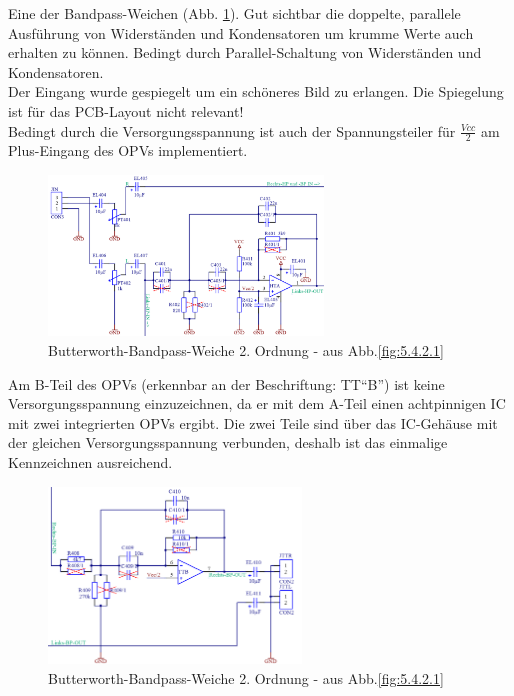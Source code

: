 \newpage
Eine der Bandpass-Weichen (Abb. \ref{fig:5.4.2.2}).
Gut sichtbar die doppelte, parallele Ausführung von Widerständen und Kondensatoren um krumme Werte auch erhalten zu können.
Bedingt durch Parallel-Schaltung von Widerständen und Kondensatoren.\\ 
Der Eingang wurde gespiegelt um ein schöneres Bild zu erlangen.
Die Spiegelung ist für das PCB-Layout nicht relevant!\\
Bedingt durch die Versorgungsspannung ist auch der Spannungsteiler für $\frac{Vcc}{2}$ am Plus-Eingang des OPVs implementiert.
\begin{figure} [H]
	\centering	
	\includegraphics[width=0.65\textwidth]{img/Print4/4_TTuHTWeiche-LinksHP-Schematic.PNG}
	\caption{Butterworth-Bandpass-Weiche 2. Ordnung - aus Abb.\ref{fig:5.4.2.1}}
	\label {fig:5.4.2.2}
\end{figure}
Am B-Teil des OPVs (erkennbar an der Beschriftung: TT\enquote{B}) ist keine Versorgungsspannung einzuzeichnen, da er mit dem A-Teil einen achtpinnigen IC mit zwei integrierten OPVs ergibt.
Die zwei Teile sind über das IC-Gehäuse mit der gleichen Versorgungsspannung verbunden, deshalb ist das einmalige Kennzeichnen ausreichend.\\
\begin{figure} [H]
	\centering	
	\includegraphics[width=0.6\textwidth]{img/Print4/4_TTuHTWeiche-RechtsBP-Schematic.PNG}
	\caption{Butterworth-Bandpass-Weiche 2. Ordnung - aus Abb.\ref{fig:5.4.2.1}}
	\label {fig:5.4.2.3}
\end{figure}

